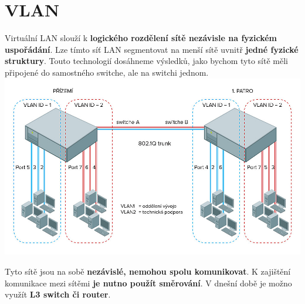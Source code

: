 \section{VLAN}
\label{sec:vlan}
Virtuální LAN slouží k \textbf{logického rozdělení sítě nezávisle na fyzickém uspořádání}.
Lze tímto síť LAN segmentovat na menší sítě uvnitř \textbf{jedné fyzické struktury}.
Touto technologií dosáhneme výsledků, jako bychom tyto sítě měli připojené do samostného switche, ale na switchi jednom. \\
\includegraphics[width=\linewidth]{TVY-POS/VLAN/VLAN.jpg}

Tyto sítě jsou na sobě \textbf{nezávislé, nemohou spolu komunikovat}.
K zajištění komunikace mezi sítěmi \textbf{je nutno použít směrování}.
V dnešní době je možno využít \textbf{L3 switch či router}.

